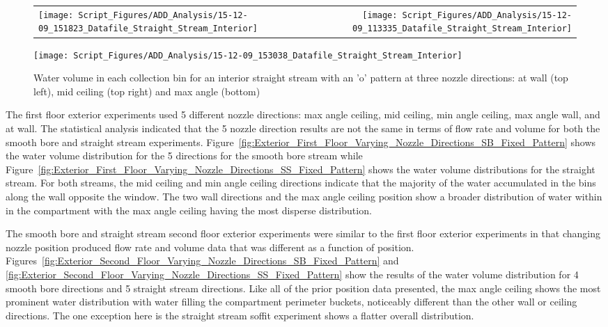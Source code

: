 \documentclass{article}
\begin{document}
\begin{figure}[ht]
\begin{tabular*}{\textwidth}{lr}
\texttt{[image: Script\_Figures/ADD\_Analysis/15-12-09\_151823\_Datafile\_Straight\_Stream\_Interior]} &
\texttt{[image: Script\_Figures/ADD\_Analysis/15-12-09\_113335\_Datafile\_Straight\_Stream\_Interior]} \\
\end{tabular*}
\centering
\texttt{[image: Script\_Figures/ADD\_Analysis/15-12-09\_153038\_Datafile\_Straight\_Stream\_Interior]}
\caption{Water volume in each collection bin for an interior straight stream with an 'o' pattern at three nozzle directions: at wall (top left), mid ceiling (top right) and max angle (bottom)}
\label{fig:Interior_Varying_Nozzle_Direction_SS_O_Pattern}
\end{figure}

\clearpage

The first floor exterior experiments used 5 different nozzle directions: max angle ceiling, mid ceiling, min angle ceiling, max angle wall, and at wall. The statistical analysis indicated that the 5 nozzle direction results are not the same in terms of flow rate and volume for both the smooth bore and straight stream experiments. Figure~\ref{fig:Exterior_First_Floor_Varying_Nozzle_Directions_SB_Fixed_Pattern} shows the water volume distribution for the 5 directions for the smooth bore stream while Figure~\ref{fig:Exterior_First_Floor_Varying_Nozzle_Directions_SS_Fixed_Pattern} shows the water volume distributions for the straight stream. For both streams, the mid ceiling and min angle ceiling directions indicate that the majority of the water accumulated in the bins along the wall opposite the window. The two wall directions and the max angle ceiling position show a broader distribution of water within in the compartment with the max angle ceiling having the most disperse distribution.

The smooth bore and straight stream second floor exterior experiments were similar to the first floor exterior experiments in that changing nozzle position produced flow rate and volume data that was different as a function of position. Figures~\ref{fig:Exterior_Second_Floor_Varying_Nozzle_Directions_SB_Fixed_Pattern} and \ref{fig:Exterior_Second_Floor_Varying_Nozzle_Directions_SS_Fixed_Pattern} show the results of the water volume distribution for 4 smooth bore directions and 5 straight stream directions. Like all of the prior position data presented, the max angle ceiling shows the most prominent water distribution with water filling the compartment perimeter buckets, noticeably different than the other wall or ceiling directions. The one exception here is the straight stream soffit experiment shows a flatter overall distribution. 
\end{document}
